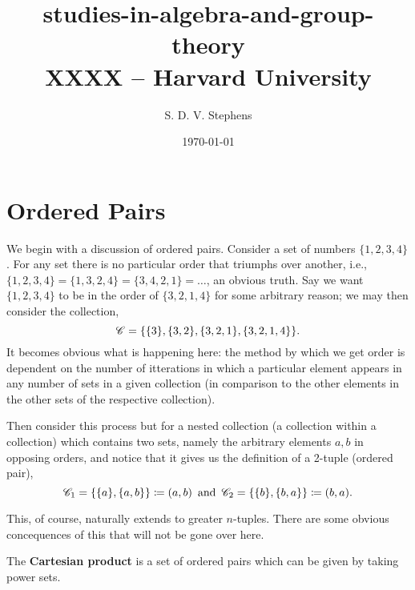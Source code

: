 \documentclass{report}
\title{\Huge{studies-in-algebra-and-group-theory}\\XXXX -- Harvard University}
\author{\huge{S. D. V. Stephens}}
\date{\today}
\begin{document}
\maketitle
\newpage
{}
\tableofcontents
\pagebreak




\section{Ordered Pairs}
We begin with a discussion of ordered pairs. Consider a set of numbers \( \{1,2,3,4\}   \). For any set there is no particular order that triumphs over another, i.e., \( \{1,2,3,4\} = \{1,3,2,4\} = \{3,4,2,1\} =\ldots     \), an obvious truth. Say we want \( \{1,2,3,4\}   \) to be in the order of \( \{3,2,1,4\}   \) for some arbitrary reason; we may then consider the collection,
\[
  {\mathscr{C}} = \{\{3\} , \{3,2\} ,\{3,2,1\} , \{3,2,1,4\}     \}
.\] 
It becomes obvious what is happening here: the method by which we get order is dependent on the number of itterations in which a particular element appears in any number of sets in a given collection (in comparison to the other elements in the other sets of the respective collection). 

Then consider this process but for a nested collection (a collection within a collection) which contains two sets, namely the arbitrary elements \( a,b \) in opposing orders, and notice that it gives us the definition of a 2-tuple (ordered pair),
\[
  {\mathscr{C}}_{1} = \{\{a\} ,\{a,b\}   \} \coloneqq (a,b) \, \text{ and }\, {\mathscr{C}}_{2}  = \{\{b\} ,\{b,a\}   \} \coloneqq  (b,a)  
.\] 

This, of course, naturally extends to greater \( n \)-tuples. There are some obvious concequences of this that will not be gone over here. 

The \textbf{Cartesian product} is a set of ordered pairs which can be given by taking power sets. 

\end{document}
